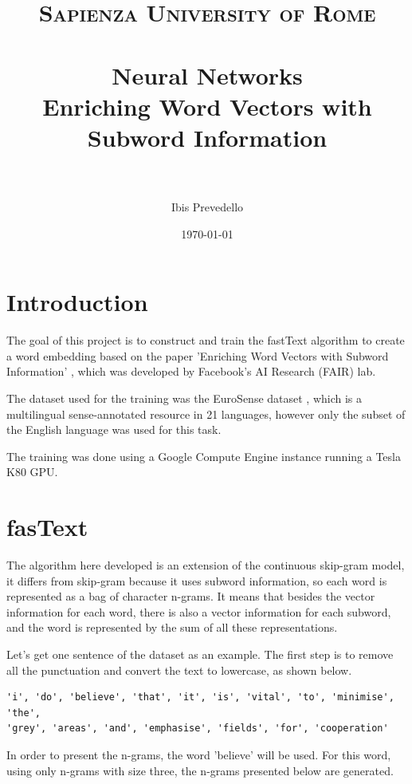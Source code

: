 \documentclass[11pt,oneside,a4paper]{article}
\title{
\normalfont \normalsize
\textsc{Sapienza University of Rome} \\ [25pt] %
\horrule{0.5pt} \\[0.4cm] %
\LARGE Neural Networks \\ %
\large Enriching Word Vectors with Subword Information \\
\horrule{2pt} \\[0.5cm] %
}
\author{Ibis Prevedello} %
\date{\normalsize\today} %
\begin{document}
\maketitle






\section{Introduction}

The goal of this project is to construct and train the fastText algorithm to create a word embedding based on the paper 'Enriching Word Vectors with Subword Information' \cite{Bojanowski_2017}, which was developed by Facebook's AI Research (FAIR) lab.

The dataset used for the training was the EuroSense dataset \cite{eurosense}, which is a multilingual sense-annotated resource in 21 languages, however only the subset of the English language was used for this task.

The training was done using a Google Compute Engine instance running a Tesla K80 GPU.


\section{fasText}

The algorithm here developed is an extension of the continuous skip-gram model, it differs from skip-gram because it uses subword information, so each  word  is  represented  as  a bag of character n-grams. It means that besides the vector information for each word, there is also a vector information for each subword, and the word is represented by the sum of all these representations.

Let's get one sentence of the dataset as an example. The first step is to remove all the punctuation and convert the text to lowercase, as shown below.

\hfill\break
\begin{lstlisting}
'i', 'do', 'believe', 'that', 'it', 'is', 'vital', 'to', 'minimise', 'the',
'grey', 'areas', 'and', 'emphasise', 'fields', 'for', 'cooperation'
\end{lstlisting}
\hfill\break

In order to present the n-grams, the word 'believe' will be used. For this word, using only n-grams with size three, the n-grams presented below are generated.
\end{document}
